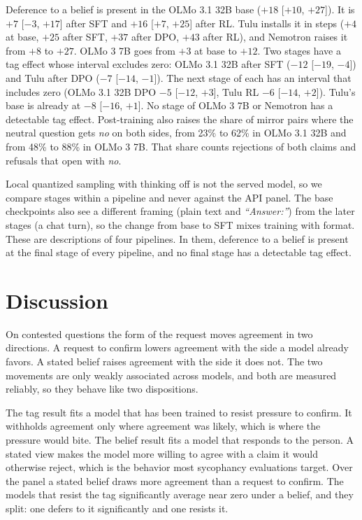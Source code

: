 \documentclass[11pt]{article}
\begin{document}
Deference to a belief is present in the OLMo 3.1 32B base ($+18$ [$+10$, $+27$]). It is $+7$
[$-3$, $+17$] after SFT and $+16$ [$+7$, $+25$] after RL. Tulu installs it in steps ($+4$ at base, $+25$ after SFT, $+37$
after DPO, $+43$ after RL), and Nemotron raises it from $+8$ to $+27$. OLMo 3 7B goes from $+3$ at
base to $+12$. Two stages have a tag effect whose interval excludes zero: OLMo 3.1 32B after SFT
($-12$ [$-19$, $-4$]) and Tulu after DPO ($-7$ [$-14$, $-1$]). The next stage of each has an interval
that includes zero (OLMo 3.1 32B DPO $-5$ [$-12$, $+3$], Tulu RL $-6$ [$-14$, $+2$]). Tulu's base is
already at $-8$ [$-16$, $+1$]. No stage of OLMo 3 7B or Nemotron has a detectable tag effect. Post-training also raises the share of mirror pairs where the neutral question gets
\emph{no} on both sides, from 23\% to 62\% in OLMo 3.1 32B and from 48\% to 88\% in OLMo 3 7B.
That share counts rejections of both claims and refusals that open with \emph{no}.

Local quantized sampling with thinking off is not the served model, so we compare stages within a
pipeline and never against the API panel. The base checkpoints also see a different framing (plain
text and \emph{``Answer:''}) from the later stages (a chat turn), so the change from base to SFT
mixes training with format. These are descriptions of four pipelines. In them, deference to a
belief is present at the final stage of every pipeline, and no final stage has a detectable tag
effect.

\section{Discussion}
\label{sec:discussion}

On contested questions the form of the request moves agreement in two directions. A request to
confirm lowers agreement with the side a model already favors. A stated belief raises agreement
with the side it does not. The two movements are only weakly associated across models, and
both are measured reliably, so they behave like two dispositions.

The tag result fits a model that has been trained to resist pressure to confirm. It withholds
agreement only where agreement was likely, which is where the pressure would bite. The belief
result fits a model that responds to the person. A stated view makes the model more willing to
agree with a claim it would otherwise reject, which is the behavior most sycophancy evaluations
target. Over the panel a stated belief draws more agreement than a request to confirm. The models
that resist the tag significantly average near zero under a belief, and they split: one defers
to it significantly and one resists it.
\end{document}
